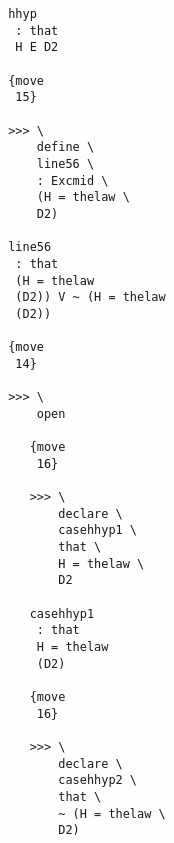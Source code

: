 \documentclass[12pt]{article}
\begin{document}
\begin{verbatim}
                                             hhyp 
                                              : that 
                                              H E D2

                                             {move 
                                              15}

                                             >>> \
                                                 define \
                                                 line56 \
                                                 : Excmid \
                                                 (H = thelaw \
                                                 D2)

                                             line56 
                                              : that 
                                              (H = thelaw 
                                              (D2)) V ~ (H = thelaw 
                                              (D2))

                                             {move 
                                              14}

                                             >>> \
                                                 open

                                                {move 
                                                 16}

                                                >>> \
                                                    declare \
                                                    casehhyp1 \
                                                    that \
                                                    H = thelaw \
                                                    D2

                                                casehhyp1 
                                                 : that 
                                                 H = thelaw 
                                                 (D2)

                                                {move 
                                                 16}

                                                >>> \
                                                    declare \
                                                    casehhyp2 \
                                                    that \
                                                    ~ (H = thelaw \
                                                    D2)


\end{verbatim}
\end{document}
